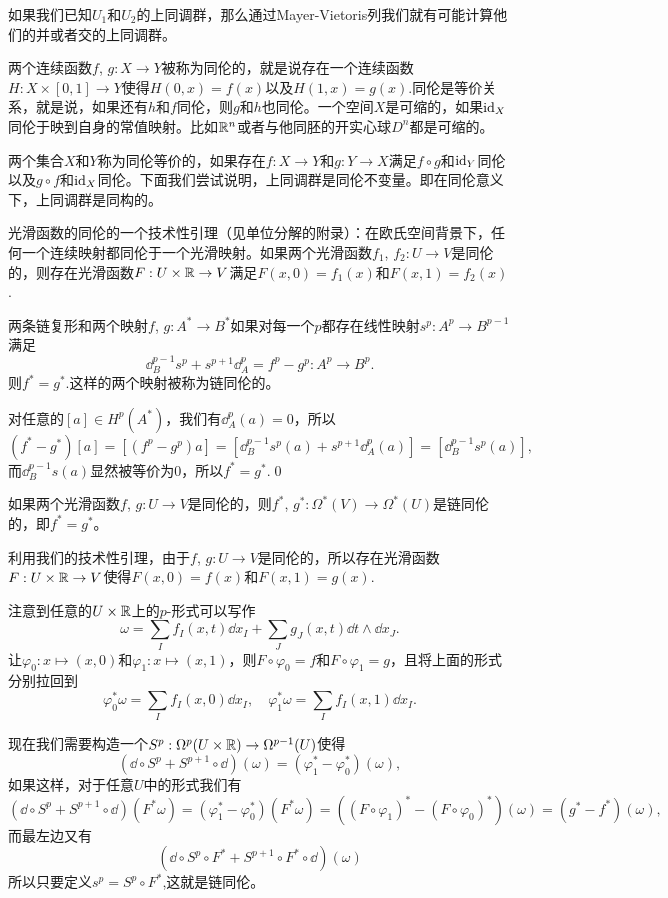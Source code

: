 如果我们已知$U_1$和$U_2$的上同调群，那么通过Mayer-Vietoris列我们就有可能计算他们的并或者交的上同调群。

\para 两个连续函数$f$, $g:X\to Y$被称为{\kaishu 同伦}的，就是说存在一个连续函数$H:X\times [0,1]\to Y$使得$H(0,x)=f(x)$以及$H(1,x)=g(x)$.同伦是等价关系，就是说，如果还有$h$和$f$同伦，则$g$和$h$也同伦。一个空间$X$是可缩的，如果$\operatorname{id}_X$同伦于映到自身的常值映射。比如$\mathbb{R}^n$或者与他同胚的开实心球$D^n$都是可缩的。

两个集合$X$和$Y$称为同伦等价的，如果存在$f:X\to Y$和$g:Y\to X$满足$f\circ g$和$\operatorname{id}_Y$同伦以及$g\circ f$和$\operatorname{id}_X$同伦。下面我们尝试说明，上同调群是同伦不变量。即在同伦意义下，上同调群是同构的。

\lem 光滑函数的同伦的一个技术性引理（见单位分解的附录）：在欧氏空间背景下，任何一个连续映射都同伦于一个光滑映射。如果两个光滑函数$f_1$, $f_2:U\to V$是同伦的，则存在光滑函数$F:U\times \mathbb{R}\to V$满足$F(x,0)=f_1(x)$和$F(x,1)=f_2(x)$.

\pro 两条链复形和两个映射$f$, $g:A^*\to B^*$如果对每一个$p$都存在线性映射$s^p:A^p \to B^{p-1}$满足
\[
\dd_B^{p-1}s^p+s^{p+1}\dd_A^p=f^p-g^p:A^p\to B^p.
\]
则$f^*=g^*$.这样的两个映射被称为链同伦的。

\proof 对任意的$[a]\in H^p(A^*)$，我们有$\dd_A^p(a)=0$，所以
\[
(f^*-g^*)[a]=[(f^p-g^p)a]=[\dd^{p-1}_Bs^p(a)+s^{p+1}\dd_A^p(a)]=[\dd^{p-1}_Bs^p(a)],
\]
而$\dd^{p-1}_Bs(a)$显然被等价为0，所以$f^*=g^*$.\qed

\pro 如果两个光滑函数$f$, $g:U\to V$是同伦的，则$
f^*$, $g^*:\Omega^*(V)\to \Omega^*(U)$是链同伦的，即$f^*=g^*$。

\proof 利用我们的技术性引理，由于$f$, $g:U\to V$是同伦的，所以存在光滑函数$F:U\times \mathbb{R} \to V$使得$F(x,0)=f(x)$和$F(x,1)=g(x)$.

注意到任意的$U\times \mathbb{R}$上的$p$-形式可以写作
\[
\omega=\sum_If_I(x,t)\dd x_I+\sum_J g_J(x,t)\dd t\wedge \dd x_J.
\]
让$\varphi_0:x\mapsto (x,0)$和$\varphi_1:x\mapsto (x,1)$，则$F\circ \varphi_0=f$和$F\circ \varphi_1=g$，且将上面的形式分别拉回到
\[
\varphi_0^*\omega=\sum_I f_I(x,0)\dd x_I,\quad
\varphi_1^*\omega=\sum_I f_I(x,1)\dd x_I.
\]

现在我们需要构造一个$S^p:\Omega^p(U\times \mathbb{R})\to \Omega^{p-1}(U)$使得
\[
(\dd \circ S^p+S^{p+1}\circ \dd)(\omega)=(\varphi_1^*-\varphi_0^*)(\omega),
\]
如果这样，对于任意$U$中的形式我们有
\[
(\dd \circ S^p+S^{p+1}\circ \dd)(F^*\omega)=(\varphi_1^*-\varphi_0^*)(F^*\omega)=((F\circ \varphi_1)^*-(F\circ \varphi_0)^*)(\omega)=(g^*-f^*)(\omega),
\]
而最左边又有
\[
(\dd \circ S^p\circ F^*+S^{p+1}\circ F^* \circ \dd)(\omega)
\]
所以只要定义$s^p=S^p\circ F^*$,这就是链同伦。

